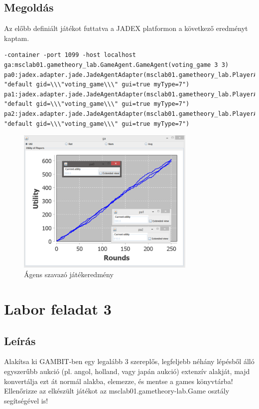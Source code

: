 \subsection{Megoldás}
Az előbb definiált játékot futtatva a JADEX platformon a következő eredményt kaptam.
\begin{lstlisting}[caption=Szavazás run config, frame=single,float=!ht]
-container -port 1099 -host localhost 
ga:msclab01.gametheory_lab.GameAgent.GameAgent(voting_game 3 3) 
pa0:jadex.adapter.jade.JadeAgentAdapter(msclab01.gametheory_lab.PlayerAgent.Player 
"default gid=\\\"voting_game\\\" gui=true myType=7") 
pa1:jadex.adapter.jade.JadeAgentAdapter(msclab01.gametheory_lab.PlayerAgent.Player 
"default gid=\\\"voting_game\\\" gui=true myType=7")
pa2:jadex.adapter.jade.JadeAgentAdapter(msclab01.gametheory_lab.PlayerAgent.Player 
"default gid=\\\"voting_game\\\" gui=true myType=7")
\end{lstlisting}
\begin{figure}[h]
\begin{center}
\includegraphics[height=7cm]{figures/voting_jadex.png}
\caption{Ágens szavazó játékeredmény}
\end{center}
\end{figure}

\section{Labor feladat 3}
\subsection{Leírás}
Alakítsa ki GAMBIT-ben egy legalább 3 szereplős, legfeljebb néhány lépésből álló egyszerűbb aukció (pl. angol, holland, vagy japán aukció) extenzív alakját, majd konvertálja ezt át normál alakba, elemezze, és mentse a games könyvtárba! Ellenőrizze az elkészült játékot az msclab01.gametheory-lab.Game osztály segítségével is! 
